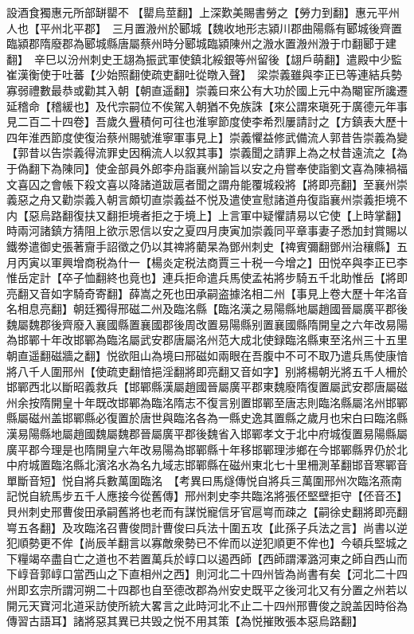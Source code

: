 設酒食獨惠元所部缾罌不【罌烏莖翻】上深歎美賜書勞之【勞力到翻】惠元平州人也【平州北平郡】　三月置溵州於郾城【魏收地形志潁川郡曲陽縣有郾城後齊置臨潁郡隋廢郡為郾城縣唐屬蔡州時分郾城臨潁陳州之溵水置溵州溵于巾翻郾于建翻】　辛巳以汾州刺史王翃為振武軍使鎮北綏銀等州留後【翃戶萌翻】遣殿中少監崔漢衡使于吐蕃【少始照翻使疏吏翻吐從暾入聲】　梁崇義雖與李正已等連結兵勢寡弱禮數最恭或勸其入朝【朝直遥翻】崇義曰來公有大功於國上元中為閹宦所讒遷延稽命【稽緩也】及代宗嗣位不俟駕入朝猶不免族誅【來公謂來瑱死于廣德元年事見二百二十四卷】吾歲久舋積何可往也淮寧節度使李希烈屢請討之【方鎮表大歷十四年淮西節度使復治蔡州賜號淮寧軍事見上】崇義懼益修武備流人郭昔告崇義為變【郭昔以告崇義得流罪史因稱流人以叙其事】崇義聞之請罪上為之杖昔遠流之【為于偽翻下為陳同】使金部員外郎李舟詣襄州諭旨以安之舟嘗奉使詣劉文喜為陳禍福文喜囚之會帳下殺文喜以降諸道跋扈者聞之謂舟能覆城殺將【將即亮翻】至襄州崇義惡之舟又勸崇義入朝言頗切直崇義益不悦及遣使宣慰諸道舟復詣襄州崇義拒境不内【惡烏路翻復扶又翻拒境者拒之于境上】上言軍中疑懼請易以它使【上時掌翻】時兩河諸鎮方猜阻上欲示恩信以安之夏四月庚寅加崇義同平章事妻子悉加封賞賜以鐵劵遣御史張著齎手詔徵之仍以其禆將藺杲為鄧州刺史【禆賓彌翻鄧州治穰縣】五月丙寅以軍興增商税為什一【楊炎定税法商賈三十税一今增之】田悦卒與李正已李惟岳定計【卒子恤翻終也竟也】連兵拒命遣兵馬使孟祐將步騎五千北助惟岳【將即亮翻又音如字騎奇寄翻】薛嵩之死也田承嗣盗據洺相二州【事見上卷大歷十年洺音名相息亮翻】朝廷獨得邢磁二州及臨洺縣【臨洺漢之易陽縣地屬趙國晉屬廣平郡後魏屬魏郡後齊廢入襄國縣置襄國郡後周改置易陽縣别置襄國縣隋開皇之六年改易陽為邯鄲十年改邯鄲為臨洺屬武安郡唐屬洺州范大成北使録臨洺縣東至洺州三十五里朝直遥翻磁牆之翻】悦欲阻山為境曰邢磁如兩眼在吾腹中不可不取乃遣兵馬使康愔將八千人圍邢州【使疏吏翻愔挹淫翻將即亮翻又音如字】别將楊朝光將五千人柵於邯鄲西北以斷昭義救兵【邯鄲縣漢屬趙國晉屬廣平郡東魏廢隋復置屬武安郡唐屬磁州余按隋開皇十年既改邯鄲為臨洺隋志不復言别置邯鄲至唐志則臨洺縣屬洺州邯鄲縣屬磁州盖邯鄲縣必復置於唐世與臨洺各為一縣史逸其置縣之歲月也宋白曰臨洺縣漢易陽縣地屬趙國魏屬魏郡晉屬廣平郡後魏省入邯鄲孝文于北中府城復置易陽縣屬廣平郡今理是也隋開皇六年改易陽為邯鄲縣十年移邯鄲理涉鄉在今邯鄲縣界仍於北中府城置臨洺縣北濱洺水為名九域志邯鄲縣在磁州東北七十里柵測革翻邯音寒鄲音單斷音短】悦自將兵數萬圍臨洺　【考異曰馬燧傳悦自將兵三萬圍邢州次臨洺燕南記悦自統馬步五千人應接今從舊傳】邢州刺史李共臨洺將張伾堅壁拒守【伾音丕】貝州刺史邢曹俊田承嗣舊將也老而有謀悦寵信牙官扈㟧而疎之【嗣徐史翻將即亮翻㟧五各翻】及攻臨洺召曹俊問計曹俊曰兵法十圍五攻【此孫子兵法之言】尚書以逆犯順勢更不侔【尚辰羊翻言以寡敵衆勢已不侔而以逆犯順更不侔也】今頓兵堅城之下糧竭卒盡自亡之道也不若置萬兵於崞口以遏西師【西師謂澤潞河東之師自西山而下崞音郭崞口當西山之下直相州之西】則河北二十四州皆為尚書有矣【河北二十四州即玄宗所謂河朔二十四郡也自至德改郡為州安史既平之後河北又有分置之州若以開元天寶河北道采訪使所統大畧言之此時河北不止二十四州邢曹俊之說盖因時俗為傳習古語耳】諸將惡其異已共毁之悦不用其策【為悦摧敗張本惡烏路翻】

